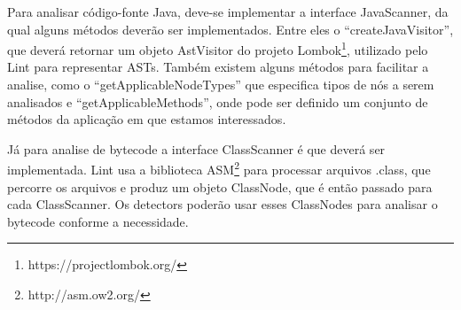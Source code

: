 Para analisar código-fonte Java, deve-se implementar a interface JavaScanner, da 
qual alguns métodos deverão ser implementados. Entre eles o “createJavaVisitor”, 
que deverá retornar um objeto AstVisitor do projeto Lombok\footnote{https://projectlombok.org/}, 
utilizado pelo Lint para representar ASTs. Também existem alguns métodos para facilitar 
a analise, como o “getApplicableNodeTypes” que especifica tipos de nós a serem analisados 
e “getApplicableMethods”, onde pode ser definido um conjunto de métodos da aplicação
em que estamos interessados.

Já para analise de bytecode a interface ClassScanner é que deverá ser implementada. 
Lint usa a biblioteca ASM\footnote{http://asm.ow2.org/} para processar arquivos .class, que percorre os arquivos 
e produz um objeto ClassNode, que é então passado para cada ClassScanner. Os detectors 
poderão usar esses ClassNodes para analisar o bytecode conforme a necessidade.


